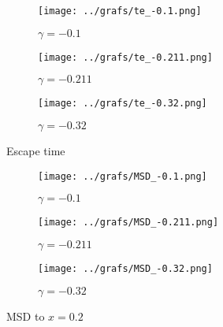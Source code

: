 \documentclass[12pt, a4paper]{article}
\begin{document}
\begin{figure}[!h]
     \centering
     \begin{subfigure}[b]{0.3\textwidth}
         \centering
         \texttt{[image: ../grafs/te\_-0.1.png]}
         \caption{$\gamma=-0.1$}
         \label{fig:y equals x}
     \end{subfigure}
     \hfill
     \begin{subfigure}[b]{0.3\textwidth}
         \centering
         \texttt{[image: ../grafs/te\_-0.211.png]}
         \caption{$\gamma=-0.211$}
         \label{fig:three sin x}
     \end{subfigure}
     \hfill
     \begin{subfigure}[b]{0.3\textwidth}
         \centering
         \texttt{[image: ../grafs/te\_-0.32.png]}
         \caption{$\gamma=-0.32$}
         \label{fig:five over x}
     \end{subfigure}
        \caption{Escape time}
        \label{fig:three graphs}
\end{figure}

\begin{figure}[!h]
     \centering
     \begin{subfigure}[b]{0.3\textwidth}
         \centering
         \texttt{[image: ../grafs/MSD\_-0.1.png]}
         \caption{$\gamma=-0.1$}
         \label{fig:y equals x}
     \end{subfigure}
     \hfill
     \begin{subfigure}[b]{0.3\textwidth}
         \centering
         \texttt{[image: ../grafs/MSD\_-0.211.png]}
         \caption{$\gamma=-0.211$}
         \label{fig:three sin x}
     \end{subfigure}
     \hfill
     \begin{subfigure}[b]{0.3\textwidth}
         \centering
         \texttt{[image: ../grafs/MSD\_-0.32.png]}
         \caption{$\gamma=-0.32$}
         \label{fig:five over x}
     \end{subfigure}
        \caption{MSD to $x=0.2$}
        \label{fig:three graphs}
\end{figure}
\end{document}
